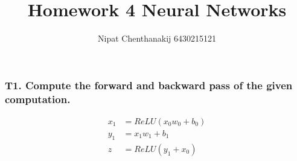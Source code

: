 \documentclass{article}
\begin{document}
\title{Homework 4 Neural Networks}
\author{Nipat Chenthanakij 6430215121}
\date{}
\maketitle
\subsubsection*{T1. Compute the forward and backward pass of the given computation.}
\begin{align*}
    x_1 & =ReLU(x_0 w_0+b_0) \\
    y_1 & =x_1 w_1 + b_1     \\
    z   & =ReLU(y_1+x_0)
\end{align*}

\end{document}
